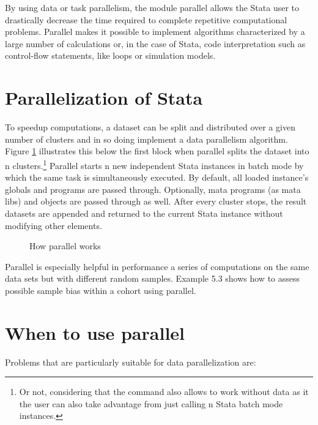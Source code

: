 \documentclass[bib]{statapress}
\begin{document}
By using data or task parallelism, the module parallel allows the Stata user to drastically decrease the time required to complete repetitive computational problems. Parallel makes it possible to implement algorithms characterized by a large number of calculations or, in the case of Stata, code interpretation such as control-flow statements, like loops or simulation models.

\section{Parallelization of Stata}

To speedup computations, a dataset can be split and distributed over a given number of clusters and in so doing implement a data parallelism algorithm. Figure \ref{fig:howworks} illustrates this below the first block when parallel splits the dataset into n clusters.\footnote{Or not, considering that the command also allows to work without data as it the user can also take advantage from just calling n Stata batch mode instances.} Parallel starts n new independent Stata instances in batch mode by which the same task is simultaneously executed. By default, all loaded instance’s globals and programs are passed through. Optionally, mata programs (as mata libs) and objects are passed through as well. After every cluster stops, the result datasets are appended and returned to the current Stata instance without modifying other elements.

\begin{figure}[tb]
\caption{How parallel works\label{fig:howworks}}
\bigskip
\centering
\scalebox{1}{}
\end{figure}

Parallel is especially helpful in performance a series of computations on the same data sets but with different random samples. Example 5.3 shows how to assess possible sample bias within a cohort using parallel.

\pagebreak

\section{When to use parallel}

Problems that are particularly suitable for data parallelization are:
\end{document}
